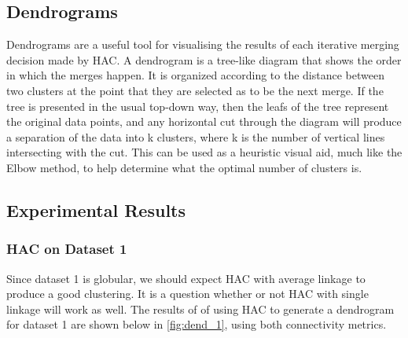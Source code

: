 \documentclass[12pt]{article}
\begin{document}
\subsection{Dendrograms} 

Dendrograms are a useful tool for visualising the results of each 
iterative merging decision made by HAC.
A dendrogram is a tree-like diagram that shows the order in which the merges happen.
It is organized according to the distance between two clusters at the point that
they are selected as to be the next merge. If the tree is presented in the usual
top-down way, then the leafs of the tree represent the original data points, and
any horizontal cut through the diagram will produce a separation of the data
into k clusters, where k is the number of vertical lines intersecting with the cut.
This can be used as a heuristic visual aid, much like the Elbow method, to help
determine what the optimal number of clusters is.

\subsection{Experimental Results}

\subsubsection{HAC on Dataset 1}

Since dataset 1 is globular, we should expect HAC with average linkage to produce
a good clustering. It is a question whether or not HAC with single linkage will
work as well. The results of of using HAC to generate a dendrogram for dataset 1
are shown below in \ref{fig:dend_1}, using both connectivity metrics.
\end{document}
